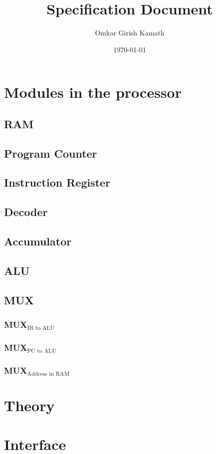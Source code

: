 \documentclass[11pt]{article}
\author{Omkar Girish Kamath}
\date{\today}
\title{Specification Document}
\begin{document}
\maketitle
\tableofcontents

\section{Modules in the processor}
\label{sec:org66a1556}
\subsection{RAM}
\label{sec:org18a4248}
\subsection{Program Counter}
\label{sec:org9657a28}
\subsection{Instruction Register}
\label{sec:org2b1f17e}
\subsection{Decoder}
\label{sec:org30d703d}
\subsection{Accumulator}
\label{sec:org4c38eac}
\subsection{ALU}
\label{sec:org87aa88d}
\subsection{MUX}
\label{sec:org1849579}
\subsubsection{MUX\(_{\text{IR to ALU}}\)}
\label{sec:orgc96fe45}
\subsubsection{MUX\(_{\text{PC to ALU}}\)}
\label{sec:orgd04906a}
\subsubsection{MUX\(_{\text{Address in RAM}}\)}
\label{sec:orge3ec7bd}
\section{Theory}
\label{sec:org123bbba}
\section{Interface}
\label{sec:org8133db9}
\end{document}
